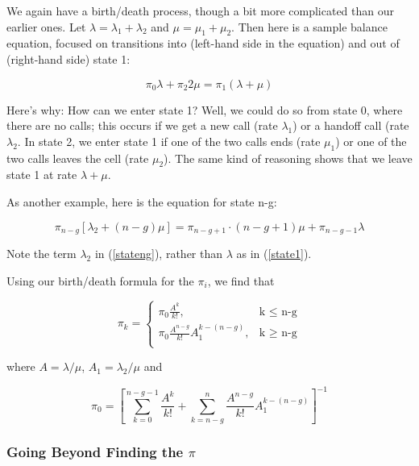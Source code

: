 We again have a birth/death process, though a bit more complicated than
our earlier ones.  Let $\lambda = \lambda_1 + \lambda_2$ and $\mu =
\mu_1 + \mu_2$.  Then here is a sample balance equation, focused on
transitions into (left-hand side in the equation) and out of (right-hand
side) state 1:

\begin{equation}
\label{state1}
\pi_0 \lambda + \pi_2 2 \mu = \pi_1 (\lambda + \mu)
\end{equation}

Here's why:  How can we enter state 1?  Well, we could do so from state
0, where there are no calls; this occurs if we get a new call (rate
$\lambda_1$) or a handoff  call (rate $\lambda_2$.  In state 2, we enter
state 1 if one of the two calls ends (rate $\mu_1$) or one of the two
calls leaves the cell (rate $\mu_2$).  The same kind of reasoning shows
that we leave state 1 at rate $\lambda + \mu$. 

As another example, here is the equation for state n-g:

\begin{equation}
\label{stateng}
\pi_{n-g} [\lambda_2 + (n-g) \mu] = \pi_{n-g+1} \cdot (n-g+1) \mu +
\pi_{n-g-1} \lambda
\end{equation} 

Note the term $\lambda_2$ in (\ref{stateng}), rather than $\lambda$ as
in (\ref{state1}). 

Using our birth/death formula for the $\pi_i$, we find that

\begin{equation}
\pi_k = \begin{cases}
   \pi_0 \frac{A^k}{k!}, & \text{k $\leq$ n-g} \\
   \pi_0 \frac{A^{n-g}}{k!} A_1^{k-(n-g)}, & \text{k $\geq$ n-g} \\
\end{cases}
\end{equation}

where $A = \lambda/\mu$, $A_1 = \lambda_2/\mu$ and

\begin{equation}
\pi_0 = \left [
\sum_{k=0}^{n-g-1} \frac{A^k}{k!} + 
\sum_{k=n-g}^n \frac{A^{n-g}}{k!} A_1^{k-(n-g)}
\right ] ^ {-1}
\end{equation}

\subsubsection{Going Beyond Finding the $\pi$}

